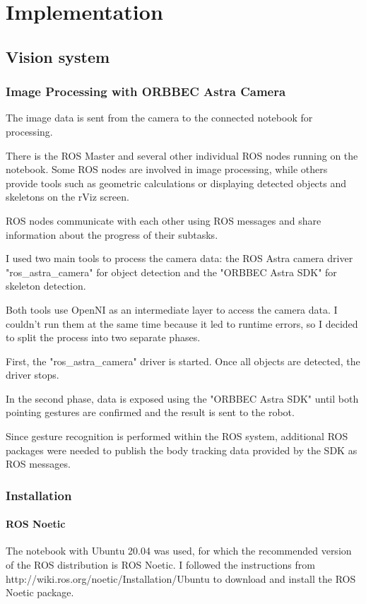 \chapter{Implementation}

\section{Vision system}

\subsection{Image Processing with ORBBEC Astra Camera}
The image data is sent from the camera to the connected notebook for processing.\par
There is the ROS Master and several other individual ROS nodes running on the notebook. Some ROS nodes are involved in image processing, while others provide tools such as geometric calculations or displaying detected objects and skeletons on the rViz screen.\par
ROS nodes communicate with each other using ROS messages and share information about the progress of their subtasks.\par
I used two main tools to process the camera data: the ROS Astra camera driver "ros\_astra\_camera" for object detection and the "ORBBEC Astra SDK" for skeleton detection.\par
Both tools use OpenNI as an intermediate layer to access the camera data. I couldn't run them at the same time because it led to runtime errors, so I decided to split the process into two separate phases.\par
First, the "ros\_astra\_camera" driver is started. Once all objects are detected, the driver stops.\par
In the second phase, data is exposed using the "ORBBEC Astra SDK" until both pointing gestures are confirmed and the result is sent to the robot. \par
Since gesture recognition is performed within the ROS system, additional ROS packages were needed to publish the body tracking data provided by the SDK as ROS messages.\par

\subsection{Installation}

\subsubsection{ROS Noetic}
The notebook with Ubuntu 20.04 was used, for which the recommended version of the ROS distribution is ROS Noetic. I followed the instructions from http://wiki.ros.org/noetic/Installation/Ubuntu to download and install the ROS Noetic package.\par

